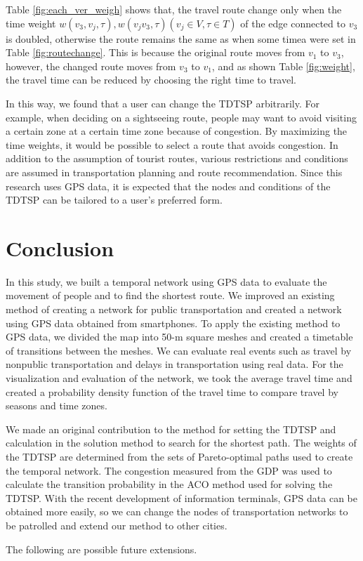 \documentclass[conference]{IEEEtran}
\begin{document}
\par Table \ref{fig:each_ver_weigh} shows that, the travel route change only when the time weight $w(v_3, v_j, \tau), w(v_j v_3, \tau) (v_j \in V , \tau \in T)$ of the edge connected to $v_3$ is doubled, otherwise the route remains the same as when some timea were set in Table \ref{fig:routechange}.
This is because the original route moves from $v_1$ to $v_3$, however, the changed route moves from $v_3$ to $v_1$, and as shown Table \ref{fig:weight}, the travel time can be reduced by choosing the right time to travel.
\par In this way, we found that a user can change the TDTSP arbitrarily.
For example, when deciding on a sightseeing route, people may want to avoid visiting a certain zone at a certain time zone because of congestion.
By maximizing the time weights, it would be possible to select a route that avoids congestion.
In addition to the assumption of tourist routes, various restrictions and conditions are assumed in transportation planning and route recommendation.
Since this research uses GPS data, it is expected that the nodes and conditions of the TDTSP can be tailored to a user's preferred form.

\section{Conclusion}
\label{sec:con}
\par In this study, we built a temporal network using GPS data to evaluate the movement of people and to find the shortest route.
We improved an existing method of creating a network for public transportation and created a network using GPS data obtained from smartphones.
To apply the existing method to GPS data, we divided the map into 50-m square meshes and created a timetable of transitions between the meshes.
We can evaluate real events such as travel by nonpublic transportation and delays in transportation using real data.
For the visualization and evaluation of the network, we took the average travel time and created a probability density function of the travel time to compare travel by seasons and time zones.
\par We made an original contribution to the method for setting the TDTSP and calculation in the solution method to search for the shortest path.
The weights of the TDTSP are determined from the sets of Pareto-optimal paths used to create the temporal network.
The congestion measured from the GDP was used to calculate the transition probability in the ACO method used for solving the TDTSP.
With the recent development of information terminals, GPS data can be obtained more easily, so we can change the nodes of transportation networks to be patrolled and extend our method to other cities.
\par The following are possible future extensions.
\end{document}
